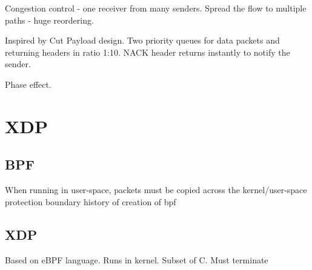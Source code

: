 Congestion control - one receiver from many senders.
Spread the flow to multiple paths - huge reordering.

Inspired by Cut Payload design.
Two priority queues for data packets and returning headers in ratio 1:10.
NACK header returns instantly to notify the sender.

Phase effect.



\chapter{XDP}

\section{BPF}
When running in user-space, packets must be copied across the kernel/user-space protection boundary
history of creation of bpf


\section{XDP}
Based on eBPF language.
Runs in kernel.
Subset of C.
Must terminate
